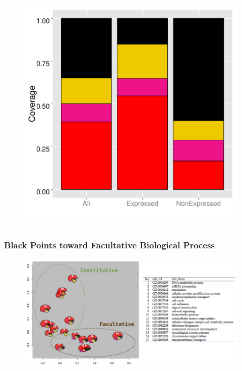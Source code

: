 \documentclass{beamer}
\begin{document}
\begin{frame}
\begin{columns}
		\begin{column}{.5\textwidth}
		\begin{figure}
   			\includegraphics[width=1.\textwidth]{figs/TSSnpIDR}
  		\end{figure}
		
		\end{column}
	\end{columns}
\end{frame}

\begin{frame}
	\frametitle{Black Points toward Facultative Biological Process}
	\pause
	\begin{figure}
   			\includegraphics[width=1\textwidth]{figs/GOSpie}
    \end{figure}

\end{frame}
\end{document}
